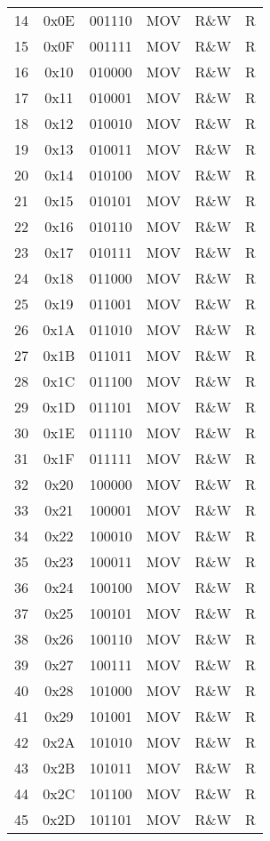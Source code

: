 \documentclass[oneside, a4paper]{memoir}
\begin{document}
\begin{center}
\begin{longtable}{cccccc}
14 & 0x0E & 001110 & MOV   & R\&W  & R  \\
15 & 0x0F & 001111 & MOV   & R\&W  & R  \\
16 & 0x10 & 010000 & MOV   & R\&W  & R  \\
17 & 0x11 & 010001 & MOV   & R\&W  & R  \\
18 & 0x12 & 010010 & MOV   & R\&W  & R  \\
19 & 0x13 & 010011 & MOV   & R\&W  & R  \\
20 & 0x14 & 010100 & MOV   & R\&W  & R  \\
21 & 0x15 & 010101 & MOV   & R\&W  & R  \\
22 & 0x16 & 010110 & MOV   & R\&W  & R  \\
23 & 0x17 & 010111 & MOV   & R\&W  & R  \\
24 & 0x18 & 011000 & MOV   & R\&W  & R  \\
25 & 0x19 & 011001 & MOV   & R\&W  & R  \\
26 & 0x1A & 011010 & MOV   & R\&W  & R  \\
27 & 0x1B & 011011 & MOV   & R\&W  & R  \\
28 & 0x1C & 011100 & MOV   & R\&W  & R  \\
29 & 0x1D & 011101 & MOV   & R\&W  & R  \\
30 & 0x1E & 011110 & MOV   & R\&W  & R  \\
31 & 0x1F & 011111 & MOV   & R\&W  & R  \\
32 & 0x20 & 100000 & MOV   & R\&W  & R  \\
33 & 0x21 & 100001 & MOV   & R\&W  & R  \\
34 & 0x22 & 100010 & MOV   & R\&W  & R  \\
35 & 0x23 & 100011 & MOV   & R\&W  & R  \\
36 & 0x24 & 100100 & MOV   & R\&W  & R  \\
37 & 0x25 & 100101 & MOV   & R\&W  & R  \\
38 & 0x26 & 100110 & MOV   & R\&W  & R  \\
39 & 0x27 & 100111 & MOV   & R\&W  & R  \\
40 & 0x28 & 101000 & MOV   & R\&W  & R  \\
41 & 0x29 & 101001 & MOV   & R\&W  & R  \\
42 & 0x2A & 101010 & MOV   & R\&W  & R  \\
43 & 0x2B & 101011 & MOV   & R\&W  & R  \\
44 & 0x2C & 101100 & MOV   & R\&W  & R  \\
45 & 0x2D & 101101 & MOV   & R\&W  & R  \\

\end{longtable}
\end{center}
\end{document}
